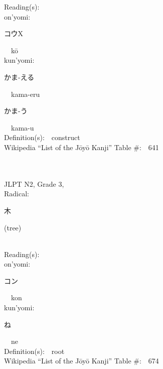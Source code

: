 \begin{multicols}{2}
Reading(s):\ \ \\
{\hspace*{1em}}on'yomi:\ \ \\
{\hspace*{2em}}{\begin{CJK}{UTF8}{min} コウX \end{CJK}}\ \ k\=o\ \ \\
{\hspace*{1em}}kun'yomi:\ \ \\
{\hspace*{2em}}{\begin{CJK}{UTF8}{min} かま-える \end{CJK}}\ \ kama-eru\ \ \\
{\hspace*{2em}}{\begin{CJK}{UTF8}{min} かま-う \end{CJK}}\ \ kama-u\ \ \\
Definition(s):\ \ construct \\
Wikipedia ``List of the J\=oy\=o Kanji'' Table \#:\ \ 641 \\
\ \ \\
{\fontsize{34pt}{40pt}  }\ \ \\  %
{JLPT N2, Grade 3, \\Radical:\ \ {\begin{CJK}{UTF8}{min} 木 \end{CJK}} (tree) } \\
Reading(s):\ \ \\
{\hspace*{1em}}on'yomi:\ \ \\
{\hspace*{2em}}{\begin{CJK}{UTF8}{min} コン \end{CJK}}\ \ kon\ \ \\
{\hspace*{1em}}kun'yomi:\ \ \\
{\hspace*{2em}}{\begin{CJK}{UTF8}{min} ね \end{CJK}}\ \ ne\ \ \\
Definition(s):\ \ root \\
Wikipedia ``List of the J\=oy\=o Kanji'' Table \#:\ \ 674 \\

\end{multicols}
